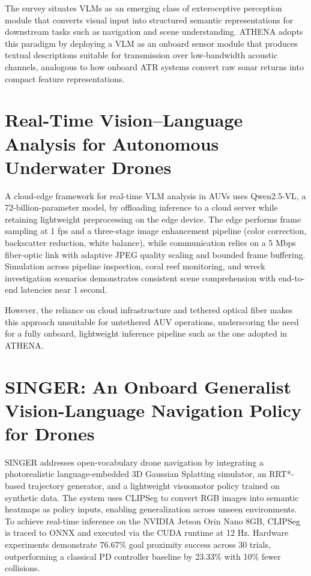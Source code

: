 The survey situates VLMs as an emerging class of exteroceptive perception module that converts visual input into structured semantic representations for downstream tasks such as navigation and scene understanding. ATHENA adopts this paradigm by deploying a VLM as an onboard sensor module that produces textual descriptions suitable for transmission over low-bandwidth acoustic channels, analogous to how onboard ATR systems convert raw sonar returns into compact feature representations.

\section[Li \& Zhang]{Real-Time Vision--Language Analysis for Autonomous Underwater Drones~\cite{li2}}
A cloud-edge framework for real-time VLM analysis in AUVs uses Qwen2.5-VL, a 72-billion-parameter model, by offloading inference to a cloud server while retaining lightweight preprocessing on the edge device. The edge performs frame sampling at 1 fps and a three-stage image enhancement pipeline (color correction, backscatter reduction, white balance), while communication relies on a 5 Mbps fiber-optic link with adaptive JPEG quality scaling and bounded frame buffering. Simulation across pipeline inspection, coral reef monitoring, and wreck investigation scenarios demonstrates consistent scene comprehension with end-to-end latencies near 1 second.

However, the reliance on cloud infrastructure and tethered optical fiber makes this approach unsuitable for untethered AUV operations, underscoring the need for a fully onboard, lightweight inference pipeline such as the one adopted in ATHENA.

\section[Adang, Low, Shorinwa \& Schwager]{SINGER: An Onboard Generalist Vision-Language Navigation Policy for Drones~\cite{singer}}
SINGER addresses open-vocabulary drone navigation by integrating a photorealistic language-embedded 3D Gaussian Splatting simulator, an RRT*-based trajectory generator, and a lightweight visuomotor policy trained on synthetic data. The system uses CLIPSeg to convert RGB images into semantic heatmaps as policy inputs, enabling generalization across unseen environments. To achieve real-time inference on the NVIDIA Jetson Orin Nano 8GB, CLIPSeg is traced to ONNX and executed via the CUDA runtime at 12 Hz. Hardware experiments demonstrate 76.67\% goal proximity success across 30 trials, outperforming a classical PD controller baseline by 23.33\% with 10\% fewer collisions.

